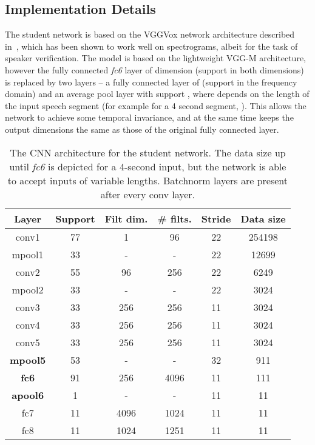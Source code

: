 \documentclass[sigconf]{acmart}
\begin{document}
\subsection{Implementation Details} \label{sec:implement}
The student network is based on the VGGVox network architecture described in~\cite{Nagrani17}, which has been shown to work well on spectrograms, albeit for the task of speaker verification. The model is based on the lightweight VGG-M architecture, however the fully connected {\em fc6} layer of dimension  (support in both dimensions) is replaced by two layers -- a fully connected layer of  (support in the frequency domain) and an average pool layer with support , where  depends on the length of the input speech segment
(for example for a 4 second segment, ).  
This allows the network to achieve some temporal invariance, 
and at the same time keeps the output dimensions the same as those of the original fully connected layer. 
\begin{table}[ht]
\scriptsize
\centering
\begin{tabular}{| c | c |  c | c | c | c | }
  \hline
  \textbf{Layer}  &  \textbf{Support} & \textbf{Filt dim.} & \textbf{\# filts.} 
  & \textbf{Stride} & \textbf{Data size} \\ \hline 

  conv1 & 77 & 1  & 96 & 22 & 254198 \\ \hline
  mpool1 & 33 & -  & - & 22 & 12699\\ \hline 
  conv2 & 55 & 96  & 256 & 22 & 6249 \\ \hline
  mpool2 & 33 & -  & - & 22 & 3024 \\ \hline   
  conv3 & 33 & 256  & 256 & 11 & 3024 \\ \hline
  conv4 & 33 & 256  & 256 & 11 & 3024 \\ \hline
  conv5 & 33 & 256  & 256 & 11 & 3024 \\ \hline
  {\bf mpool5} & 53 & -  & - & 32 & 911 \\ \hline   
  {\bf fc6} & 91 & 256  & 4096 & 11 & 111 \\ \hline
  {\bf apool6} & 1 & -  & - & 11 & 11 \\ \hline
  fc7   & 11 & 4096  & 1024 & 11 & 11 \\ \hline
  fc8   & 11 & 1024  & 1251 & 11 & 11 \\ \hline

\end{tabular} 
\normalsize
\vspace{10pt}
\caption{The CNN architecture for the student network. 
The data size up until {\it fc6} is depicted for a 4-second input,
but the network is able to accept inputs of variable lengths. 
Batchnorm layers are present after every conv layer.
}
\label{table:convnet}
\vspace{-18pt}
\end{table}
\end{document}
